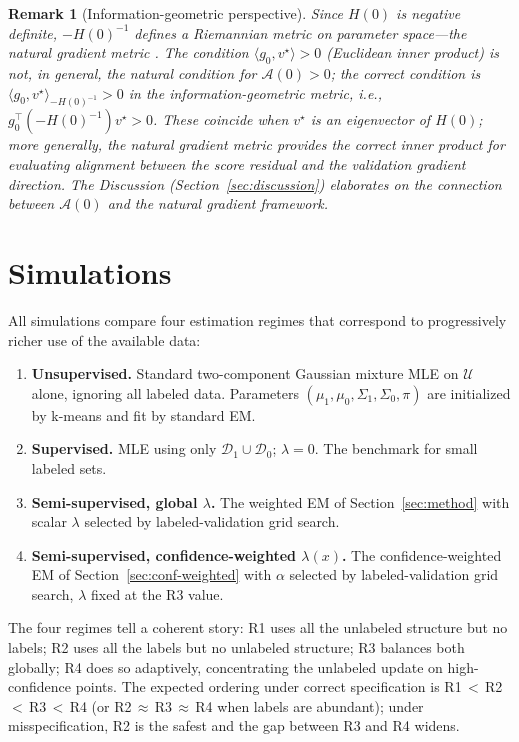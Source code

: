 \documentclass[11pt]{article}
\newtheorem{remark}{Remark}
\theoremstyle{definition}
\newcommand{\calD}{\mathcal{D}}
\newcommand{\calU}{\mathcal{U}}
\newcommand{\lam}{\lambda}
\newcommand{\Sig}{\Sigma}
\newcommand{\calA}{\mathcal{A}}
\begin{document}
\begin{remark}[Information-geometric perspective]
Since \(H(0)\) is negative definite, \(-H(0)^{-1}\) defines a
Riemannian metric on parameter space---the natural gradient metric
\citep{amari1998natural}.
The condition \(\langle g_0, v^\star\rangle > 0\) (Euclidean inner product)
is not, in general, the natural condition for \(\calA(0)>0\); the correct
condition is \(\langle g_0, v^\star\rangle_{-H(0)^{-1}} > 0\) in the
information-geometric metric, i.e.,
\(g_0^\top (-H(0)^{-1}) v^\star > 0\).
These coincide when \(v^\star\) is an eigenvector of \(H(0)\);
more generally, the natural gradient metric provides the correct
inner product for evaluating alignment between the score residual and
the validation gradient direction.
The Discussion (Section~\ref{sec:discussion}) elaborates on the connection
between \(\calA(0)\) and the natural gradient framework.
\end{remark}


\section{Simulations}
\label{sec:simulations}

All simulations compare four estimation regimes that correspond to
progressively richer use of the available data:
\begin{enumerate}[leftmargin=1.5em,label=\textbf{R\arabic*.}]
\item \textbf{Unsupervised.}
      Standard two-component Gaussian mixture MLE on \(\calU\) alone,
      ignoring all labeled data.
      Parameters \((\mu_1,\mu_0,\Sig_1,\Sig_0,\pi)\) are initialized
      by k-means and fit by standard EM.
\item \textbf{Supervised.}
      MLE using only \(\calD_1\cup\calD_0\); \(\lam=0\).
      The benchmark for small labeled sets.
\item \textbf{Semi-supervised, global \(\lam\).}
      The weighted EM of Section~\ref{sec:method} with scalar \(\lam\)
      selected by labeled-validation grid search.
\item \textbf{Semi-supervised, confidence-weighted \(\lam(x)\).}
      The confidence-weighted EM of Section~\ref{sec:conf-weighted}
      with \(\alpha\) selected by labeled-validation grid search,
      \(\lam\) fixed at the R3 value.
\end{enumerate}
The four regimes tell a coherent story: R1 uses all the unlabeled
structure but no labels; R2 uses all the labels but no unlabeled
structure; R3 balances both globally; R4 does so adaptively,
concentrating the unlabeled update on high-confidence points.
The expected ordering under correct specification is R1\,\(<\)\,R2\,\(<\)\,R3\,\(<\)\,R4
(or R2\,\(\approx\)\,R3\,\(\approx\)\,R4 when labels are abundant);
under misspecification, R2 is the safest and the gap between R3 and R4
widens.
\end{document}
